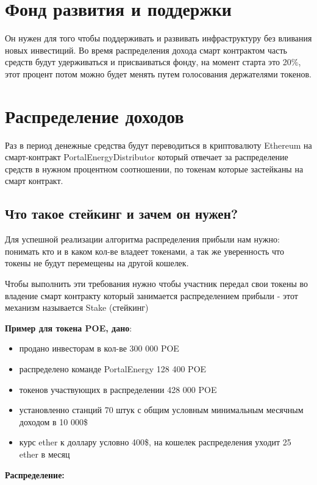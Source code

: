 \documentclass[a4paper,12pt]{report}
\begin{document}
\section{Фонд развития и поддержки}
\label{storage}
Он нужен для того чтобы поддерживать и развивать инфраструктуру без вливания новых инвестиций.
Во время распределения дохода смарт контрактом часть средств будут удерживаться и присваиваться фонду, на момент старта это 20\%, этот процент потом можно будет менять путем голосования держателями токенов. 

\section{Распределение доходов}
\label{capital}
Раз в период денежные средства будут переводиться в криптовалюту Ethereum на смарт-контракт PortalEnergyDistributor который отвечает за распределение средств в нужном процентном соотношении, по токенам которые застейканы на смарт контракт.

\subsection{Что такое стейкинг и зачем он нужен?}

Для успешной реализации алгоритма распределения прибыли нам нужно: понимать кто и в каком кол-ве владеет токенами, а так же уверенность что токены не будут перемещены на другой кошелек. 

Чтобы выполнить эти требования нужно чтобы участник передал свои токены во владение смарт контракту который занимается распределением прибыли - этот механизм называется Stake (стейкинг)

\textbf{Пример для токена POE, дано}:

\begin{itemize}
	\item продано инвесторам в кол-ве 300 000 POE
	\item распределено команде PortalEnergy 128 400 POE
	\item токенов участвующих в распределении 428 000 POE
	\item установленно станций 70 штук с общим условным минимальным месячным доходом в 10 000\$
	\item курс ether к доллару условно 400\$,  на кошелек распределения уходит 25 ether в месяц
\end{itemize}

\textbf{Распределение:}
\end{document}
